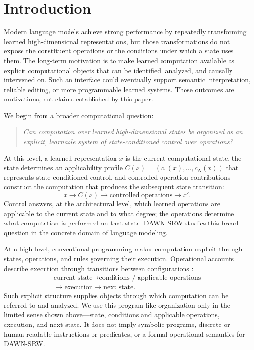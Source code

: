 \documentclass{article}
\newcommand{\DAWN}{DAWN-SRW}
\begin{document}
\section{Introduction}
\label{sec:introduction}

Modern language models achieve strong performance by repeatedly transforming
learned high-dimensional representations, but those transformations do not
expose the constituent operations or the conditions under which a state uses
them. The long-term motivation is to make learned computation available as
explicit computational objects that can be identified, analyzed, and causally
intervened on. Such an interface could eventually support semantic
interpretation, reliable editing, or more programmable learned systems. Those
outcomes are motivations, not claims established by this paper.

We begin from a broader computational question:
\begin{quote}
\emph{Can computation over learned high-dimensional states be organized as an
explicit, learnable system of state-conditioned control over operations?}
\end{quote}
At this level, a learned representation \(x\) is the current computational state,
the state determines an applicability profile
\(C(x)=(c_1(x),\ldots,c_N(x))\) that represents state-conditioned control, and
controlled operation contributions construct the computation that produces the
subsequent state transition:
\[
x\longrightarrow C(x)\longrightarrow
\text{controlled operations}\longrightarrow x'.
\]
Control answers, at the architectural level, which learned operations are
applicable to the current state and to what degree; the operations determine
what computation is performed on that state. \DAWN{} studies this broad question
in the concrete domain of language modeling.

At a high level, conventional programming makes computation explicit through
states, operations, and rules governing their execution. Operational accounts
describe execution through transitions between configurations
\cite{plotkin1981structural}:
\[
\begin{gathered}
\text{current state}
\longrightarrow
\text{conditions / applicable operations}\\[-0.15em]
\longrightarrow
\text{execution}
\longrightarrow
\text{next state}.
\end{gathered}
\]
Such explicit structure supplies objects through which computation can be
referred to and analyzed. We use this program-like organization only in the
limited sense shown above---state, conditions and applicable operations,
execution, and next state. It does not imply symbolic programs, discrete or
human-readable instructions or predicates, or a formal operational semantics
for \DAWN{}.
\end{document}
